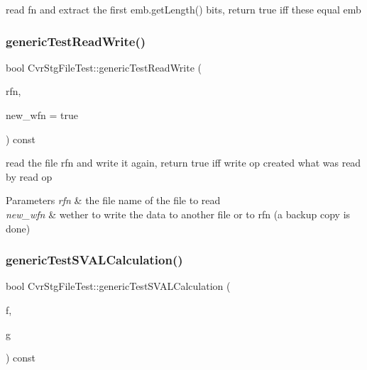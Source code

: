 read fn and extract the first emb.\+get\+Length() bits, return true iff these equal emb \mbox{\label{classCvrStgFileTest_adde58709938e4f73f988d9f631b13723}} 
\subsubsection{generic\+Test\+Read\+Write()}
{\footnotesize\ttfamily bool Cvr\+Stg\+File\+Test\+::generic\+Test\+Read\+Write (\begin{DoxyParamCaption}\item[{const std\+::string \&}]{rfn,  }\item[{bool}]{new\+\_\+wfn = {\ttfamily true} }\end{DoxyParamCaption}) const\hspace{0.3cm}{\ttfamily [protected]}}

read the file rfn and write it again, return true iff write op created what was read by read op 
\begin{DoxyParams}{Parameters}
{\em rfn} & the file name of the file to read \\
\hline
{\em new\+\_\+wfn} & wether to write the data to another file or to rfn (a backup copy is done) \\
\hline
\end{DoxyParams}
\mbox{\label{classCvrStgFileTest_a0be3c1772b798e99c963d1b99150409e}} 
\subsubsection{generic\+Test\+S\+V\+A\+L\+Calculation()}
{\footnotesize\ttfamily bool Cvr\+Stg\+File\+Test\+::generic\+Test\+S\+V\+A\+L\+Calculation (\begin{DoxyParamCaption}\item[{const \textbf{ Cvr\+Stg\+File} $\ast$}]{f,  }\item[{const \textbf{ Graph} $\ast$}]{g }\end{DoxyParamCaption}) const\hspace{0.3cm}{\ttfamily [protected]}}

